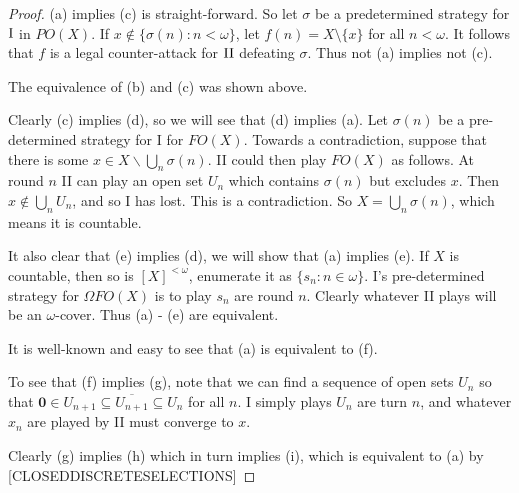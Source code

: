 \documentclass[11pt]{article}
\theoremstyle{plain}
\theoremstyle{definition}
\theoremstyle{remark}
\theoremstyle{plain}
\theoremstyle{definition}
\theoremstyle{remark}
\begin{document}
\begin{proof}
(a) implies (c) is straight-forward. So let
\(\sigma\) be a predetermined strategy for \(\mathrm{I}\) in \(PO(X)\).
If \(x\not\in\{\sigma(n):n<\omega\}\), let \(f(n)=X\setminus\{x\}\)
for all \(n<\omega\). It follows that \(f\) is a legal
counter-attack for \(\mathrm{II}\) defeating \(\sigma\). Thus not (a) implies
not (c).

The equivalence of (b) and (c) was shown above.

Clearly (c) implies (d), so we will see that (d) implies (a).
Let \(\sigma(n)\) be a pre-determined strategy for I for \(FO(X)\).
Towards a contradiction, suppose that there is some \(x \in X \smallsetminus \bigcup_n \sigma(n)\).
II could then play \(FO(X)\) as follows.
At round \(n\) II can play an open set \(U_n\) which contains \(\sigma(n)\) but excludes \(x\).
Then \(x \notin \bigcup_n U_n\), and so I has lost.
This is a contradiction.
So \(X = \bigcup_n \sigma(n)\), which means it is countable.

It also clear that (e) implies (d), we will show that (a) implies (e).
If \(X\) is countable, then so is \([X]^{<\omega}\), enumerate it as \(\{s_n : n \in \omega\}\).
I's pre-determined strategy for \(\Omega FO(X)\) is to play \(s_n\) are round \(n\).
Clearly whatever II plays will be an \(\omega\)-cover.
Thus (a) - (e) are equivalent.

It is well-known and easy to see that (a) is equivalent to (f).

To see that (f) implies (g), note that we can find a sequence of open sets \(U_n\) so that \(\mathbf 0 \in U_{n+1} \subseteq \overline{U_{n+1}} \subseteq U_n\) for all \(n\).
I simply plays \(U_n\) are turn \(n\), and whatever \(x_n\) are played by II must converge to \(x\).

Clearly (g) implies (h) which in turn implies (i), which is
equivalent to (a) by [CLOSEDDISCRETESELECTIONS] 


\end{proof}
\end{document}
